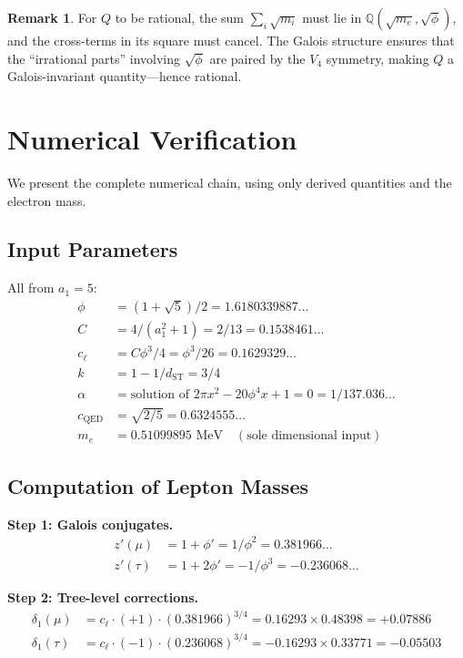 \documentclass[12pt,a4paper]{article}
\theoremstyle{definition}
\newtheorem{remark}{Remark}
\begin{document}
\begin{remark}
For $Q$ to be rational, the sum $\sum_i \sqrt{m_i}$ must lie in $\mathbb{Q}(\sqrt{m_e}, \sqrt{\phi})$, and the cross-terms in its square must cancel.  The Galois structure ensures that the ``irrational parts'' involving $\sqrt{\phi}$ are paired by the $V_4$ symmetry, making $Q$ a Galois-invariant quantity---hence rational.
\end{remark}

\section{Numerical Verification}
\label{sec:numerics}

We present the complete numerical chain, using only derived quantities and the electron mass.

\subsection{Input Parameters}

All from $a_1 = 5$:
\begin{align}
\phi &= (1+\sqrt{5})/2 = 1.6180339887\ldots \\
C &= 4/(a_1^2+1) = 2/13 = 0.1538461\ldots \\
c_\ell &= C\phi^3/4 = \phi^3/26 = 0.1629329\ldots \\
k &= 1 - 1/d_{\mathrm{ST}} = 3/4 \\
\alpha &= \text{solution of } 2\pi x^2 - 20\phi^4 x + 1 = 0 = 1/137.036\ldots \\
c_{\mathrm{QED}} &= \sqrt{2/5} = 0.6324555\ldots \\
m_e &= 0.51099895\text{ MeV} \quad (\text{sole dimensional input})
\end{align}

\subsection{Computation of Lepton Masses}

\textbf{Step 1: Galois conjugates.}
\begin{align}
z'(\mu) &= 1 + \phi' = 1/\phi^2 = 0.381966\ldots \\
z'(\tau) &= 1 + 2\phi' = -1/\phi^3 = -0.236068\ldots
\end{align}

\textbf{Step 2: Tree-level corrections.}
\begin{align}
\delta_1(\mu) &= c_\ell \cdot (+1) \cdot (0.381966)^{3/4} = 0.16293 \times 0.48398 = +0.07886 \\
\delta_1(\tau) &= c_\ell \cdot (-1) \cdot (0.236068)^{3/4} = -0.16293 \times 0.33771 = -0.05503
\end{align}
\end{document}
